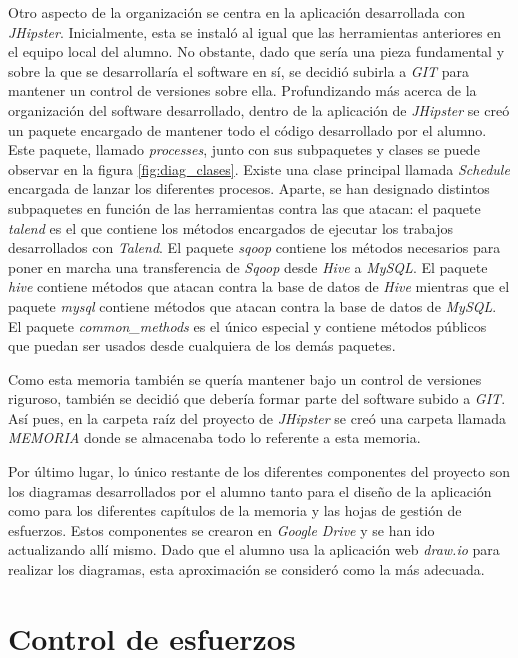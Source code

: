 \par Otro aspecto de la organización se centra en la aplicación desarrollada con \textit{JHipster}. Inicialmente, esta se instaló al igual que las herramientas anteriores en el equipo local del alumno. No obstante, dado que sería una pieza fundamental y sobre la que se desarrollaría el software en sí, se decidió subirla a \textit{GIT} para mantener un control de versiones sobre ella. Profundizando más acerca de la organización del software desarrollado, dentro de la aplicación de \textit{JHipster} se creó un paquete encargado de mantener todo el código desarrollado por el alumno. Este paquete, llamado \textit{processes}, junto con sus subpaquetes y clases se puede observar en la figura \ref{fig:diag_clases}. Existe una clase principal llamada \textit{Schedule} encargada de lanzar los diferentes procesos. Aparte, se han designado distintos subpaquetes en función de las herramientas contra las que atacan: el paquete \textit{talend} es el que contiene los métodos encargados de ejecutar los trabajos desarrollados con \textit{Talend}. El paquete \textit{sqoop} contiene los métodos necesarios para poner en marcha una transferencia de \textit{Sqoop} desde \textit{Hive} a \textit{MySQL}. El paquete \textit{hive} contiene métodos que atacan contra la base de datos de \textit{Hive} mientras que el paquete \textit{mysql} contiene métodos que atacan contra la base de datos de \textit{MySQL}. El paquete \textit{common\_methods} es el único especial y contiene métodos públicos que puedan ser usados desde cualquiera de los demás paquetes. 
\par Como esta memoria también se quería mantener bajo un control de versiones riguroso, también se decidió que debería formar parte del software subido a \textit{GIT}. Así pues, en la carpeta raíz del proyecto de \textit{JHipster} se creó una carpeta llamada \textit{MEMORIA} donde se almacenaba todo lo referente a esta memoria.
\par Por último lugar, lo único restante de los diferentes componentes del proyecto son los diagramas desarrollados por el alumno tanto para el diseño de la aplicación como para los diferentes capítulos de la memoria y las hojas de gestión de esfuerzos. Estos componentes se crearon en \textit{Google Drive} y se han ido actualizando allí mismo. Dado que el alumno usa la aplicación web \textit{draw.io} para realizar los diagramas, esta aproximación se consideró como la más adecuada. 

\section{Control de esfuerzos} \label{gestion.esfuerzos}

